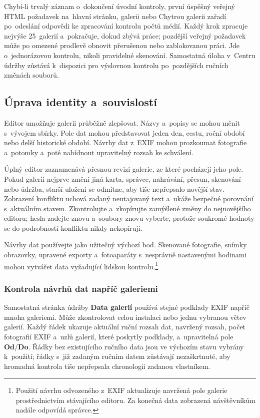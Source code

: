 \documentclass[11pt,a4paper]{article}
\newcommand{\ui}[1]{\textbf{#1}}
\begin{document}
Chybí-li trvalý záznam o~dokončení úvodní kontroly, první úspěšný veřejný HTML
požadavek na~hlavní stránku, galerii nebo Chytrou galerii zařadí po~odeslání
odpovědi ke zpracování kontrolu počtů médií. Každý krok zpracuje nejvýše
25~galerií a~pokračuje, dokud zbývá práce; pozdější veřejný požadavek může po
omezené prodlevě obnovit přerušenou nebo zablokovanou práci. Jde o~jednorázovou
kontrolu, nikoli pravidelné skenování. Samostatná úloha v~Centru údržby zůstává
k~dispozici pro výslovnou kontrolu po~pozdějších ručních změnách souborů.

\subsection{Úprava identity a~souvislostí}

Editor umožňuje galerii průběžně zlepšovat. Názvy a~popisy se mohou měnit
s~vývojem sbírky. Pole dat mohou představovat jeden den, cestu, roční období
nebo delší historické období. Návrhy dat z~EXIF mohou prozkoumat fotografie
a~potomky a~poté nabídnout upravitelný rozsah ke schválení.

Úplný editor zaznamenává přesnou revizi galerie, ze které pocházejí jeho pole.
Pokud galerii nejprve změní jiná karta, správce, nahrávání, přesun, skenování
nebo údržba, starší uložení se odmítne, aby tiše nepřepsalo novější stav.
Zobrazení konfliktu uchová zadaný neutajovaný text a~ukáže bezpečné porovnání
s~aktuálním stavem. Zkontrolujte a~zkopírujte zamýšlené změny do nejnovějšího
editoru; hesla zadejte znovu a~soubory znovu vyberte, protože soukromé hodnoty
se do podrobností konfliktu nikdy nekopírují.

Návrhy dat používejte jako užitečný výchozí bod. Skenované fotografie, snímky
obrazovky, upravené exporty a~fotoaparáty s~nesprávně nastavenými hodinami mohou
vytvářet data vyžadující lidskou kontrolu.\footnote{Použití návrhu odvozeného
z~EXIF aktualizuje navržená pole galerie prostřednictvím stávajícího editoru. Za
konečná data zobrazená návštěvníkům nadále odpovídá správce.}

\subsubsection{Kontrola návrhů dat napříč galeriemi}

Samostatná stránka údržby \ui{Data galerií} používá stejné podklady EXIF napříč
mnoha galeriemi. Může zkontrolovat celou instalaci nebo jednu vybranou větev
galerií. Každý řádek ukazuje aktuální ruční rozsah dat, navržený rozsah, počet
fotografií EXIF a~uzlů galerií, které poskytly podklady, a~upravitelná pole
\ui{Od}/\ui{Do}. Řádky bez existujícího ručního data jsou ve výchozím stavu
vybrány k~použití; řádky s~již zadaným ručním datem zůstávají nezaškrtnuté, aby
hromadná kontrola tiše nepřepsala chronologii zadanou vlastníkem.
\end{document}
